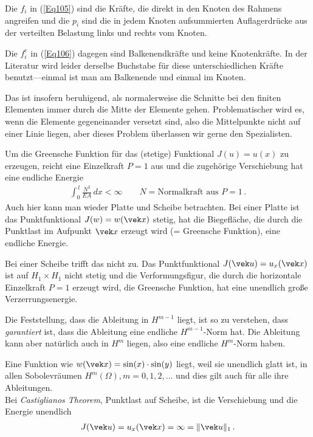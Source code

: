 {\begin{remark}
Die $f_i$ in (\ref{Eq105}) sind die Kr\"{a}fte, die direkt in den Knoten des Rahmens angreifen und die $p_i$ sind die in jedem Knoten aufsummierten Auflagerdr\"{u}cke aus der verteilten Belastung links und rechts vom Knoten.

Die $f_i^e$ in (\ref{Eq106}) dagegen sind Balkenendkr\"{a}fte und keine Knotenkr\"{a}fte. In der Literatur wird leider derselbe Buchstabe f\"{u}r diese unterschiedlichen Kr\"{a}fte benutzt---einmal ist man am Balkenende und einmal im Knoten.
\end{remark}

Das ist insofern beruhigend, als normalerweise die Schnitte bei den finiten Elementen immer durch die Mitte der Elemente gehen. Problematischer wird es, wenn die Elemente gegeneinander versetzt sind, also die Mittelpunkte nicht auf einer Linie liegen, aber dieses Problem \"{u}berlassen wir gerne den Spezialisten.

Um die Greensche Funktion f\"{u}r das (stetige)  Funktional $J(u) = u(x)$ zu erzeugen, reicht eine Einzelkraft $P = 1$ aus und die zugeh\"{o}rige Verschiebung hat eine endliche Energie
\begin{align}
\int_0^{\,l} \frac{N^2}{EA}\,dx < \infty \qquad N = \text{Normalkraft aus $P = 1$}\,.
\end{align}
Auch hier kann man wieder Platte und Scheibe betrachten. Bei einer Platte ist das Punktfunktional $J(w) = w(\vek x)$ stetig, hat die Biegefl\"{a}che, die durch die Punktlast im Aufpunkt $\vek x$ erzeugt wird (= Greensche Funktion), eine endliche Energie.

Bei einer Scheibe trifft das nicht zu. Das Punktfunktional $J(\vek u) = u_x(\vek x) $ ist auf $H_1 \times H_1$ nicht stetig und die Verformungsfigur, die durch die horizontale Einzelkraft $P = 1$ erzeugt wird, die Greensche Funktion, hat eine unendlich gro{\ss}e Verzerrungsenergie.

 Die Feststellung, dass die Ableitung in $H^{m-1}$ liegt, ist so zu verstehen, dass {\em garantiert\/} ist, dass die Ableitung eine endliche $H^{m-1}$-Norm hat. Die Ableitung kann aber nat\"{u}rlich auch in $H^m$ liegen, also eine endliche $H^m$-Norm haben.

Eine Funktion wie $w(\vek x) = \sin(x) \cdot \sin(y)$ liegt, weil sie unendlich glatt ist, in allen Sobolevr\"{a}umen $H^m(\Omega), m = 0, 1, 2, \ldots$ und dies gilt auch f\"{u}r alle ihre Ableitungen.\\

Bei {\em Castiglianos Theorem\/}, Punktlast auf Scheibe, ist die Verschiebung und die Energie unendlich
\begin{align}
J(\vek u) = u_x(\vek x) = \infty = \|\vek u\|_1\,.
\end{align}

}
